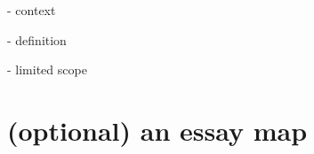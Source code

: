 \documentclass{thuemp}
\begin{document}
- context

- definition

- limited scope

\section*{(optional) an essay map}








\renewcommand\refname{\heiti\wuhao\centerline{References}\global\def\refname{References}}
\vskip 12pt

\let\OLDthebibliography\thebibliography
\renewcommand\thebibliography[1]{
  \OLDthebibliography{#1}
  \setlength{\parskip}{0pt}
  \setlength{\itemsep}{0pt plus 0.3ex}
}

{
\renewcommand{\baselinestretch}{0.9}
\liuhao


}
\end{document}
